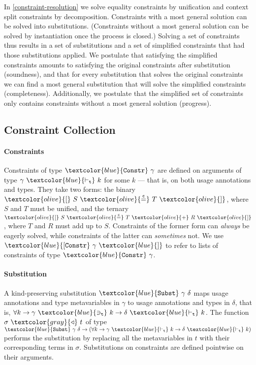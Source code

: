 \documentclass[sigplan,screen,review]{acmart}
\newcommand{\constr}[1]{\textcolor{olive}{\mathtt{#1}}}
\newcommand{\func}[1]{\textcolor{gray}{\mathtt{#1}}}
\newcommand{\type}[1]{\textcolor{blue}{\mathtt{#1}}}
\newcommand{\tvar}[2]{#1 ~\type{\ni_t}~ #2}
\newcommand{\tkind}[2]{#1 ~\type{\vdash_t}~ #2}
\newcommand{\tConstr}[1]{\type{Constr} ~ #1}
\newcommand{\tConstrs}[1]{\type{[Constr} ~ #1 ~ \type{]}}
\newcommand{\subst}[2]{#1 ~ \func{\triangleleft} ~ #2}
\newcommand{\tSubst}[2]{\type{Subst}~#1~#2}
\newcommand{\eqconstr}[2]{\constr{[} ~ #1 ~ \constr{\stackrel{c}{=}} ~ #2 ~ \constr{]}}
\newcommand{\sumconstr}[3]{\constr{[} ~ #1 ~ \constr{\stackrel{c}{=}} ~ #2 ~ \constr{+} ~ #3 ~ \constr{]}}
\begin{document}
In \autoref{constraint-resolution} we solve equality constraints by unification and context split constraints by decomposition.
Constraints with a most general solution can be solved into substitutions.
(Constraints without a most general solution can be solved by instantiation once the process is closed.)
Solving a set of constraints thus results in a set of substitutions and a set of simplified constraints that had those substitutions applied.
We postulate that satisfying the simplified constraints amounts to satisfying the original constraints after substitution (soundness), and that for every substitution that solves the original constraints we can find a most general substitution that will solve the simplified constraints (completeness).
Additionally, we postulate that the simplified set of constraints only contains constraints without a most general solution (progress).

\subsection{Constraint Collection}
\label{constraint-collection}

\paragraph{Constraints}

Constraints of type $\tConstr{\gamma}$ are defined on arguments of type $\tkind{\gamma}{k}$ for some $k$ --- that is, on both usage annotations and types.
They take two forms: the binary $\eqconstr{S}{T}$, where $S$ and $T$ must be unified, and the ternary $\sumconstr{S}{T}{R}$, where $T$ and $R$ must add up to $S$.
Constraints of the former form can \emph{always} be eagerly solved, while constraints of the latter can \emph{sometimes} not.
We use $\tConstrs{\gamma}$ to refer to lists of constraints of type $\tConstr{\gamma}$.

\paragraph{Substitution}

A kind-preserving substitution $\tSubst{\gamma}{\delta}$ maps usage annotations and type metavariables in $\gamma$ to usage annotations and types in $\delta$, that is, $\forall k \to \tvar{\gamma}{k} \to \tkind{\delta}{k}$.
The function $\subst{\sigma}{t}$ of type $\tSubst{\gamma}{\delta} \to (\forall k \to \tkind{\gamma}{k} \to \tkind{\delta}{k})$ performs the substitution by replacing all the metavariables in $t$ with their corresponding terms in $\sigma$.
Substitutions on constraints are defined pointwise on their arguments.
\end{document}
